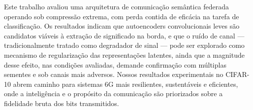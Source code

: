 \documentclass[conference]{IEEEtran}
\begin{document}
Este trabalho avaliou uma arquitetura de comunicação semântica federada operando sob compressão extrema, com perda contida de eficácia na tarefa de classificação. Os resultados indicam que autoencoders convolucionais leves são candidatos viáveis à extração de significado na borda, e que o ruído de canal --- tradicionalmente tratado como degradador de sinal --- pode ser explorado como mecanismo de regularização das representações latentes, ainda que a magnitude desse efeito, nas condições avaliadas, demande confirmação com múltiplas sementes e sob canais mais adversos. Nossos resultados experimentais no CIFAR-10 abrem caminho para sistemas 6G mais resilientes, sustentáveis e eficientes, onde a inteligência e o propósito da comunicação são priorizados sobre a fidelidade bruta dos bits transmitidos.



\end{document}

